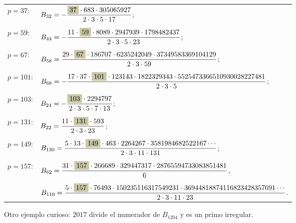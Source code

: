\documentclass{article}
\numberwithin{equation}{section}
\newcommand{\highlight}[1]{\colorbox{shadecolor}{$\displaystyle #1$}}
\theoremstyle{definition}
\begin{document}
\begin{center}
  \begin{tabular}{ll}
    $p = 37$: & $\displaystyle B_{32} = -\frac{\highlight{37}\cdot 683\cdot 305065927}{2\cdot 3 \cdot 5\cdot 17}$; \\
    \\
    $p = 59$: & $\displaystyle B_{44} = -\frac{11\cdot \highlight{59}\cdot 8089\cdot 2947939\cdot 1798482437}{2\cdot 3\cdot 5\cdot 23}$; \\
    \\
    $p = 67$: & $\displaystyle B_{58} = \frac{29\cdot \highlight{67}\cdot 186707\cdot 6235242049\cdot 37349583369104129}{2\cdot 3\cdot 59}$; \\
    \\
    $p = 101$: & $\displaystyle B_{68} = -\frac{17\cdot 37\cdot \highlight{101}\cdot 123143\cdot 1822329343\cdot 5525473366510930028227481}{2\cdot 3\cdot 5}$; \\
    \\
    $p = 103$: & $\displaystyle B_{24} = -\frac{\highlight{103}\cdot 2294797}{2\cdot 3\cdot 5\cdot 7\cdot 13}$; \\
    \\
    $p = 131$: & $\displaystyle B_{22} = \frac{11\cdot \highlight{131}\cdot 593}{2\cdot 3\cdot 23}$; \\
    \\
    $p = 149$: & $\displaystyle B_{130} = \frac{5\cdot 13\cdot \highlight{149}\cdot 463\cdot 2264267\cdot 3581984682522167 \cdots}{2\cdot 3\cdot 11\cdot 131}$; \\
    \\
    $p = 157$: & $\displaystyle B_{62} = \frac{31\cdot \highlight{157}\cdot 266689\cdot 329447317\cdot 28765594733083851481}{6}$, \\
    \\
              & $\displaystyle B_{110} = \frac{5\cdot \highlight{157}\cdot 76493\cdot 150235116317549231\cdot 36944818874116823428357691\cdots}{2\cdot 3\cdot 11\cdot 23}$. \\
  \end{tabular}
\end{center}

\vspace{1em}

Otro ejemplo curioso: $2017$ divide el numerador de $B_{1204}$ y es un primo
irregular.

\pagebreak
\end{document}
